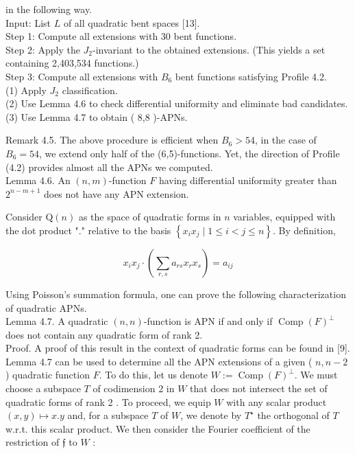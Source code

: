 \documentclass[10pt]{article}
\begin{document}
in the following way.\\
Input: List $L$ of all quadratic bent spaces [13].\\
Step 1: Compute all extensions with 30 bent functions.\\
Step 2: Apply the $J_{2}$-invariant to the obtained extensions. (This yields a set containing 2,403,534 functions.)\\
Step 3: Compute all extensions with $B_{6}$ bent functions satisfying Profile 4.2.\\
(1) Apply $J_{2}$ classification.\\
(2) Use Lemma 4.6 to check differential uniformity and eliminate bad candidates.\\
(3) Use Lemma 4.7 to obtain ( 8,8 )-APNs.

Remark 4.5. The above procedure is efficient when $B_{6}>54$, in the case of $B_{6}=54$, we extend only half of the (6,5)-functions. Yet, the direction of Profile (4.2) provides almost all the APNs we computed.\\
Lemma 4.6. An $(n, m)$-function $F$ having differential uniformity greater than $2^{n-m+1}$ does not have any APN extension.

Consider $\mathrm{Q}(n)$ as the space of quadratic forms in $n$ variables, equipped with the dot product "." relative to the basis $\left\{x_{i} x_{j} \mid 1 \leq i<j \leq n\right\}$. By definition,

$$
x_{i} x_{j} \cdot\left(\sum_{r, s} a_{r s} x_{r} x_{s}\right)=a_{i j}
$$

Using Poisson's summation formula, one can prove the following characterization of quadratic APNs.\\
Lemma 4.7. A quadratic $(n, n)$-function is APN if and only if $\operatorname{Comp}(F)^{\perp}$ does not contain any quadratic form of rank 2.\\[0pt]
Proof. A proof of this result in the context of quadratic forms can be found in [9].\\
Lemma 4.7 can be used to determine all the APN extensions of a given ( $n, n-2$ ) quadratic function $F$. To do this, let us denote $W:=\operatorname{Comp}(F)^{\perp}$. We must choose a subspace $T$ of codimension 2 in $W$ that does not intersect the set of quadratic forms of rank 2 . To proceed, we equip $W$ with any scalar product $(x, y) \mapsto x . y$ and, for a subspace $T$ of $W$, we denote by $T^{\star}$ the orthogonal of $T$ w.r.t. this scalar product. We then consider the Fourier coefficient of the restriction of $\mathfrak{f}$ to $W$ :
\end{document}
